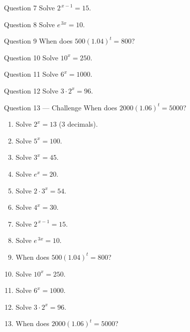 \documentclass[11pt]{article}
\begin{document}
\begin{qbox}{Question 7}
Solve $2^{\,x-1}=15$.\workspace{2.4cm}
\end{qbox}

\begin{qbox}{Question 8}
Solve $e^{\,3x}=10$.\workspace{2.4cm}
\end{qbox}

\begin{qbox}{Question 9}
When does $500(1.04)^{t}=800$?\workspace{2.4cm}
\end{qbox}

\begin{qbox}{Question 10}
Solve $10^{x}=250$.\workspace{2.4cm}
\end{qbox}

\begin{qbox}{Question 11}
Solve $6^{x}=1000$.\workspace{2.4cm}
\end{qbox}

\begin{qbox}{Question 12}
Solve $3\cdot2^{x}=96$.\workspace{2.4cm}
\end{qbox}

\begin{qbox}{Question 13 --- Challenge}
When does $2000(1.06)^{t}=5000$?\workspace{3cm}
\end{qbox}

\clearpage
{}

\begin{recapbox}
\begin{multicols}{2}
\small
\begin{enumerate}[leftmargin=*,itemsep=3pt]
  \item Solve $2^{x}=13$ (3 decimals).
  \item Solve $5^{x}=100$.
  \item Solve $3^{x}=45$.
  \item Solve $e^{x}=20$.
  \item Solve $2\cdot3^{x}=54$.
  \item Solve $4^{x}=30$.
  \item Solve $2^{\,x-1}=15$.
  \item Solve $e^{\,3x}=10$.
  \item When does $500(1.04)^{t}=800$?
  \item Solve $10^{x}=250$.
  \item Solve $6^{x}=1000$.
  \item Solve $3\cdot2^{x}=96$.
  \item When does $2000(1.06)^{t}=5000$?
\end{enumerate}
\end{multicols}
\end{recapbox}
\end{document}
